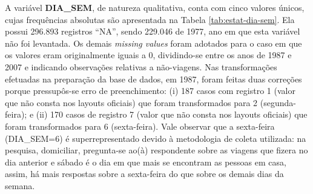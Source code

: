 \begin{table}[htb]
\centering

\end{table}

A variável \textbf{DIA_SEM}, de natureza qualitativa, conta com cinco valores únicos, cujas frequências absolutas são apresentada na Tabela \ref{tab:estat-dia-sem}.
Ela possui 296.893 registros ``NA'', sendo 229.046 de 1977, ano em que esta variável não foi levantada. Os demais \textit{missing values} foram adotados para o caso em que os valores eram originalmente iguais a 0, dividindo-se entre os anos de 1987 e 2007 e indicando observações relativas a não-viagens. Nas transformações efetuadas na preparação da base de dados, em 1987, foram feitas duas correções porque pressupôs-se erro de preenchimento: (i) 187 casos com registro 1 (valor que não consta nos layouts oficiais) que foram transformados para 2 (segunda-feira); e (ii) 170 casos de registro 7 (valor que não consta nos layouts oficiais) que foram transformados para 6 (sexta-feira).
 Vale observar que a sexta-feira (DIA_SEM=6) é superrepresentado devido à metodologia de coleta utilizada: na pesquisa, domiciliar, pregunta-se ao(à) respondente sobre as viagens que fizera no dia anterior e sábado é o dia em que mais se encontram as pessoas em casa, assim, há mais respostas sobre a sexta-feira do que sobre os demais dias da semana.

